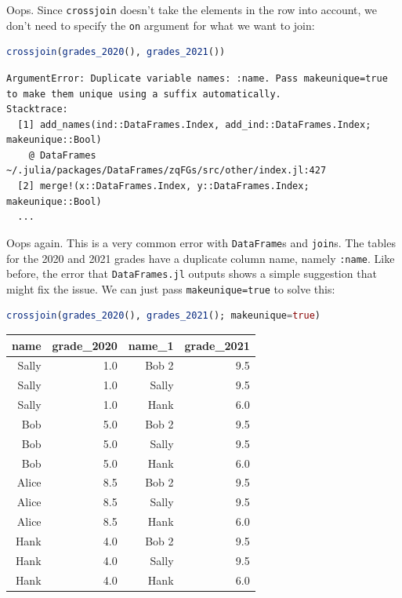 \documentclass[
  notoc %
]{tufte-book}
\newcommand{\passthrough}[1]{#1}
\begin{document}
Oops. Since \passthrough{\lstinline!crossjoin!} doesn't take the
elements in the row into account, we don't need to specify the
\passthrough{\lstinline!on!} argument for what we want to join:

\begin{lstlisting}[language=Julia]
crossjoin(grades_2020(), grades_2021())
\end{lstlisting}

\begin{lstlisting}[language=Output]
ArgumentError: Duplicate variable names: :name. Pass makeunique=true to make them unique using a suffix automatically.
Stacktrace:
  [1] add_names(ind::DataFrames.Index, add_ind::DataFrames.Index; makeunique::Bool)
    @ DataFrames ~/.julia/packages/DataFrames/zqFGs/src/other/index.jl:427
  [2] merge!(x::DataFrames.Index, y::DataFrames.Index; makeunique::Bool)
  ...
\end{lstlisting}

Oops again. This is a very common error with
\passthrough{\lstinline!DataFrame!}s and
\passthrough{\lstinline!join!}s. The tables for the 2020 and 2021 grades
have a duplicate column name, namely \passthrough{\lstinline!:name!}.
Like before, the error that \passthrough{\lstinline!DataFrames.jl!}
outputs shows a simple suggestion that might fix the issue. We can just
pass \passthrough{\lstinline!makeunique=true!} to solve this:

\begin{lstlisting}[language=Julia]
crossjoin(grades_2020(), grades_2021(); makeunique=true)
\end{lstlisting}

\begin{longtable}[]{@{}rrrr@{}}
\toprule
name & grade\_2020 & name\_1 & grade\_2021 \\
\midrule
\endhead
Sally & 1.0 & Bob 2 & 9.5 \\
Sally & 1.0 & Sally & 9.5 \\
Sally & 1.0 & Hank & 6.0 \\
Bob & 5.0 & Bob 2 & 9.5 \\
Bob & 5.0 & Sally & 9.5 \\
Bob & 5.0 & Hank & 6.0 \\
Alice & 8.5 & Bob 2 & 9.5 \\
Alice & 8.5 & Sally & 9.5 \\
Alice & 8.5 & Hank & 6.0 \\
Hank & 4.0 & Bob 2 & 9.5 \\
Hank & 4.0 & Sally & 9.5 \\
Hank & 4.0 & Hank & 6.0 \\
\bottomrule
\end{longtable}
\end{document}
